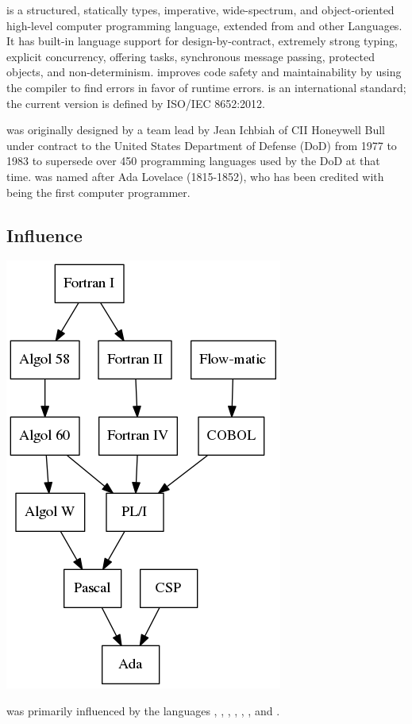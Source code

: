 \documentclass[../Languages.tex]{subfiles}
\begin{document}
\label{sec:ada}

 is a structured, statically types, imperative, wide-spectrum, and
object-oriented high-level computer programming language, extended from
 and other Languages. It has built-in language support for
design-by-contract, extremely strong typing, explicit concurrency, offering
tasks, synchronous message passing, protected objects, and non-determinism.
 improves code safety and maintainability by using the compiler to
find errors in favor of runtime errors.  is an international
standard; the current version is defined by ISO/IEC 8652:2012.

 was originally designed by a team lead by Jean Ichbiah of CII
Honeywell Bull under contract to the United States Department of Defense (DoD)
from 1977 to 1983 to supersede over 450 programming languages used by the DoD
at that time.  was named after Ada Lovelace (1815-1852), who has
been credited with being the first computer programmer.

\subsection{Influence}\label{sub:influence}

\begin{Figure}
  \centering
  \includegraphics[height=0.5\textheight]{ada}
\end{Figure}

 was primarily influenced by the languages , ,
, , , , and .

\newpage
\end{document}
